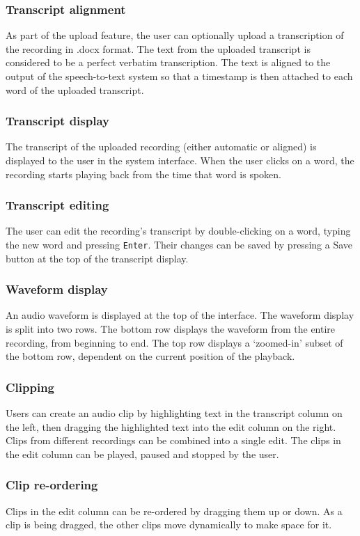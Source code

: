 \subsubsection{Transcript alignment}
As part of the upload feature, the user can optionally upload a transcription
of the recording in .docx format. The text from the uploaded transcript is
considered to be a perfect verbatim transcription. The text is aligned to the
output of the speech-to-text system so that a timestamp is then attached to
each word of the uploaded transcript.

\subsubsection{Transcript display}
The transcript of the uploaded recording (either automatic or aligned) is
displayed to the user in the system interface. When the user clicks on a word,
the recording starts playing back from the time that word is spoken.

\subsubsection{Transcript editing}
The user can edit the recording's transcript by double-clicking on a word,
typing the new word and pressing \texttt{Enter}. Their changes can be saved by
pressing a Save button at the top of the transcript display.

\subsubsection{Waveform display}
An audio waveform is displayed at the top of the interface. The waveform
display is split into two rows. The bottom row displays the waveform from the
entire recording, from beginning to end. The top row displays a `zoomed-in'
subset of the bottom row, dependent on the current position of the playback.

\subsubsection{Clipping}
Users can create an audio clip by highlighting text in the transcript column on
the left, then dragging the highlighted text into the edit column on the right.
Clips from different recordings can be combined into a single edit.  The clips
in the edit column can be played, paused and stopped by the user.

\subsubsection{Clip re-ordering}
Clips in the edit column can be re-ordered by dragging them up or down. As
a clip is being dragged, the other clips move dynamically to make space for it.

